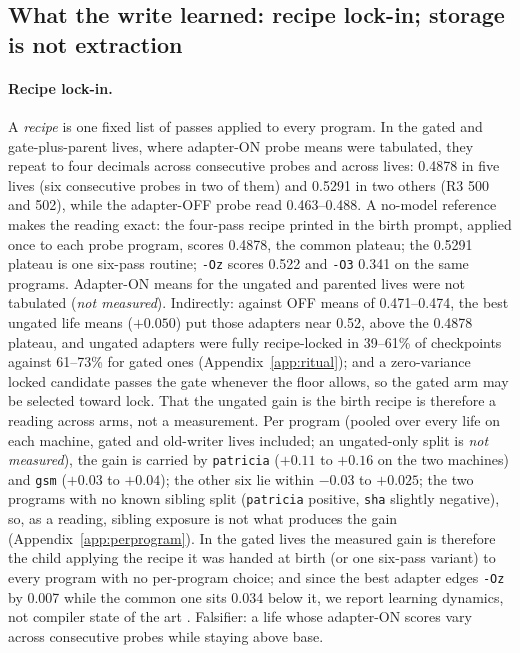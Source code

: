 \documentclass{article}
\newcommand{\nm}{\emph{not measured}}
\begin{document}
\subsection{What the write learned: recipe lock-in; storage is not extraction}
\label{sec:storage}

\paragraph{Recipe lock-in.} A \emph{recipe} is one fixed list of passes applied to every program. In the gated and gate-plus-parent lives, where adapter-ON probe means were tabulated, they repeat to four decimals across consecutive probes and across lives: 0.4878 in five lives (six consecutive probes in two of them) and 0.5291 in two others (R3 500 and 502), while the adapter-OFF probe read 0.463--0.488. A no-model reference makes the reading exact: the four-pass recipe printed in the birth prompt, applied once to each probe program, scores 0.4878, the common plateau; the 0.5291 plateau is one six-pass routine; \texttt{-Oz} scores 0.522 and \texttt{-O3} 0.341 on the same programs. Adapter-ON means for the ungated and parented lives were not tabulated (\nm). Indirectly: against OFF means of 0.471--0.474, the best ungated life means ($+0.050$) put those adapters near 0.52, above the 0.4878 plateau, and ungated adapters were fully recipe-locked in 39--61\% of checkpoints against 61--73\% for gated ones (Appendix~\ref{app:ritual}); and a zero-variance locked candidate passes the gate whenever the floor allows, so the gated arm may be selected toward lock. That the ungated gain is the birth recipe is therefore a reading across arms, not a measurement. Per program (pooled over every life on each machine, gated and old-writer lives included; an ungated-only split is \nm), the gain is carried by \texttt{patricia} ($+0.11$ to $+0.16$ on the two machines) and \texttt{gsm} ($+0.03$ to $+0.04$); the other six lie within $-0.03$ to $+0.025$; the two programs with no known sibling split (\texttt{patricia} positive, \texttt{sha} slightly negative), so, as a reading, sibling exposure is not what produces the gain (Appendix~\ref{app:perprogram}). In the gated lives the measured gain is therefore the child applying the recipe it was handed at birth (or one six-pass variant) to every program with no per-program choice; and since the best adapter edges \texttt{-Oz} by 0.007 while the common one sits 0.034 below it, we report learning dynamics, not compiler state of the art \citep{cummins2023llmcompiler}. Falsifier: a life whose adapter-ON scores vary across consecutive probes while staying above base.
\end{document}
